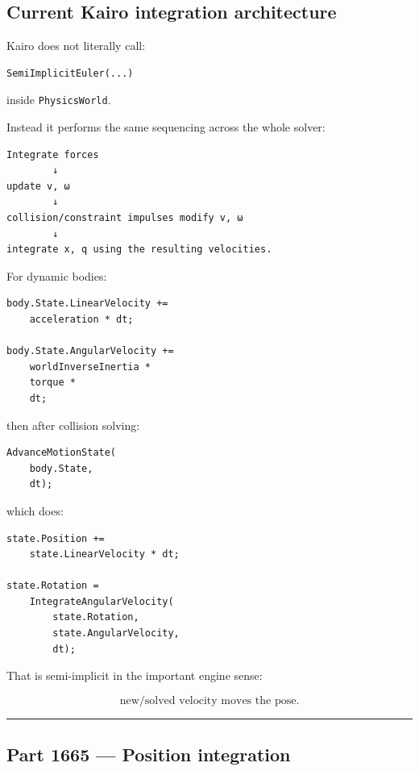 \subsection{Current Kairo integration architecture}\label{06-engine-ii-ch037-current-kairo-integration-architecture}

Kairo does not literally call:

\begin{verbatim}
SemiImplicitEuler(...)
\end{verbatim}

inside \texttt{PhysicsWorld}.

Instead it performs the same sequencing across the whole solver:

\begin{verbatim}
Integrate forces
        ↓
update v, ω
        ↓
collision/constraint impulses modify v, ω
        ↓
integrate x, q using the resulting velocities.
\end{verbatim}

For dynamic bodies:

\begin{verbatim}
body.State.LinearVelocity +=
    acceleration * dt;

body.State.AngularVelocity +=
    worldInverseInertia *
    torque *
    dt;
\end{verbatim}

then after collision solving:

\begin{verbatim}
AdvanceMotionState(
    body.State,
    dt);
\end{verbatim}

which does:

\begin{verbatim}
state.Position +=
    state.LinearVelocity * dt;

state.Rotation =
    IntegrateAngularVelocity(
        state.Rotation,
        state.AngularVelocity,
        dt);
\end{verbatim}

That is semi-implicit in the important engine sense:

\[
\boxed{
\text{new/solved velocity moves the pose.}
}
\]

\begin{center}\rule{0.5\linewidth}{0.5pt}\end{center}

\subsection{Part 1665 --- Position integration}\label{06-engine-ii-ch037-part-1665-position-integration}

